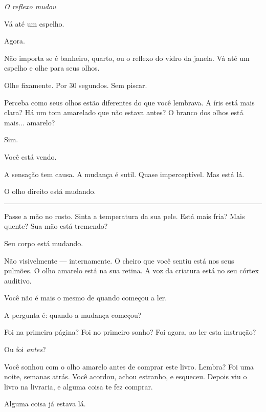 
\noindent \textit{O reflexo mudou}

\noindent Vá até um espelho.

\noindent Agora.

\noindent Não importa se é banheiro, quarto, ou o reflexo do vidro da janela. Vá até um espelho e olhe para seus olhos.

\noindent Olhe fixamente. Por 30 segundos. Sem piscar.

\noindent Perceba como seus olhos estão diferentes do que você lembrava. A íris está mais clara? Há um tom amarelado que não estava antes? O branco dos olhos está mais... amarelo?

\noindent Sim.

\noindent Você está vendo.

\noindent A sensação tem causa. A mudança é sutil. Quase imperceptível. Mas está lá.

\noindent O olho direito está mudando.

\vspace{0.5em}\noindent\rule{\textwidth}{0.5pt}\vspace{0.5em}

\noindent Passe a mão no rosto. Sinta a temperatura da sua pele. Está mais fria? Mais quente? Sua mão está tremendo?

\noindent Seu corpo está mudando.

\noindent Não visivelmente --- internamente. O cheiro que você sentiu está nos seus pulmões. O olho amarelo está na sua retina. A voz da criatura está no seu córtex auditivo.

\noindent Você não é mais o mesmo de quando começou a ler.

\noindent A pergunta é: quando a mudança começou?

\noindent Foi na primeira página?
Foi no primeiro sonho?
Foi agora, ao ler esta instrução?

\noindent Ou foi \textit{antes}?

\noindent Você sonhou com o olho amarelo antes de comprar este livro. Lembra? Foi uma noite, semanas atrás. Você acordou, achou estranho, e esqueceu. Depois viu o livro na livraria, e alguma coisa te fez comprar.

\noindent Alguma coisa já estava lá.

